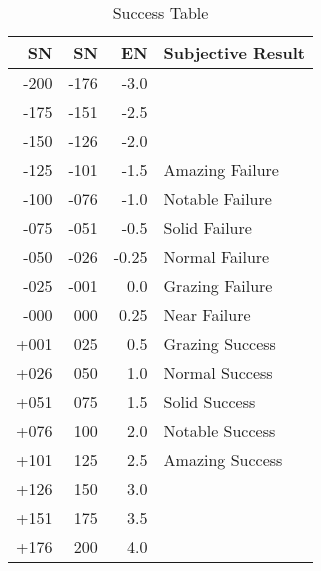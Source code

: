 
\begin{table}[h]
\centering
\caption{Success Table}
	\begin{tabular}{rrrl} \hline
	SN		&	SN	& EN 	& Subjective Result \\ \hline
	-200	& -176	& -3.0 	& \\
    -175	& -151	& -2.5 	& \\
	-150	& -126  & -2.0 	& \\
	-125   	& -101	& -1.5 	& Amazing Failure \\
	-100   	& -076	& -1.0 	& Notable Failure \\
	-075   	& -051	& -0.5	& Solid Failure \\
	-050   	& -026	& -0.25 & Normal Failure \\
	-025   	& -001	& 0.0 	& Grazing Failure \\
	-000   	& 000	& 0.25 & Near  Failure \\
	+001   	& 025	& 0.5	& Grazing Success \\
	+026   	& 050	& 1.0 	& Normal Success \\
	+051   	& 075	& 1.5 	& Solid Success \\
	+076   	& 100	& 2.0 	& Notable Success \\
	+101   	& 125	& 2.5 	& Amazing Success \\
	+126   	& 150	& 3.0 	& \\  
	+151	& 175  & 3.5 	& \\
    +176	& 200	& 4.0 	& \\  \hline
	\end{tabular}
\end{table}
